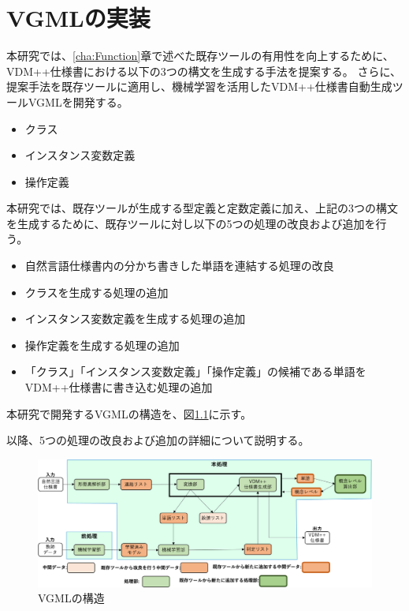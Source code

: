 \chapter{VGMLの実装}\label{cha:Implementation}

本研究では、\ref{cha:Function}章で述べた既存ツールの有用性を向上するために、VDM++仕様書における以下の3つの構文を生成する手法を提案する。
さらに、提案手法を既存ツールに適用し、機械学習を活用したVDM++仕様書自動生成ツールVGMLを開発する。

\begin{itemize}
    \item クラス
    \item インスタンス変数定義
    \item 操作定義
\end{itemize}

本研究では、既存ツールが生成する型定義と定数定義に加え、上記の3つの構文を生成するために、既存ツールに対し以下の5つの処理の改良および追加を行う。

\begin{itemize}
    \item 自然言語仕様書内の分かち書きした単語を連結する処理の改良
    \item クラスを生成する処理の追加
    \item インスタンス変数定義を生成する処理の追加
    \item 操作定義を生成する処理の追加
    \item 「クラス」「インスタンス変数定義」「操作定義」の候補である単語をVDM++仕様書に書き込む処理の追加
\end{itemize}

本研究で開発するVGMLの構造を、図\ref{fig:vgml_structure}に示す。

以降、5つの処理の改良および追加の詳細について説明する。

\begin{figure}[t]
    \begin{center}
        \includegraphics[width=1.0\columnwidth]{image/vgml_structure.png}
        \caption{VGMLの構造}
        \label{fig:vgml_structure}
    \end{center}
\end{figure}

